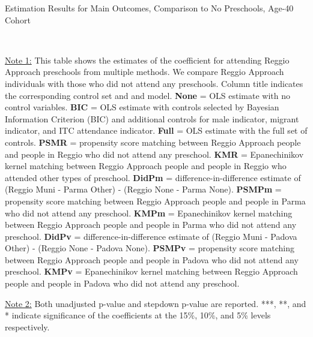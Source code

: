 \begin{table}[H] \caption{Estimation Results for Main Outcomes, Comparison to No Preschools, Age-40 Cohort} \label{ols-M-adult40-reg-nopres}
\scalebox{0.6}{}
\vspace{1ex} \\
\footnotesize\raggedright{\underline{Note 1:} This table shows the estimates of the coefficient for attending Reggio Approach preschools from multiple methods. We compare Reggio Approach individuals with those who did not attend any preschools. Column title indicates the corresponding control set and and model. \textbf{None} = OLS estimate with no control variables. \textbf{BIC} = OLS estimate with controls selected by Bayesian Information Criterion (BIC) and additional controls for male indicator, migrant indicator, and ITC attendance indicator. \textbf{Full} = OLS estimate with the full set of controls. \textbf{PSMR} =  propensity score matching between Reggio Approach people and people in Reggio who did not attend any preschool. \textbf{KMR} = Epanechinikov kernel matching between Reggio Approach people and people in Reggio who attended other types of preschool. \textbf{DidPm} = difference-in-difference estimate of (Reggio Muni - Parma Other) - (Reggio None - Parma None). \textbf{PSMPm} = propensity score matching between Reggio Approach people and people in Parma who did not attend any preschool. \textbf{KMPm} = Epanechinikov kernel matching between Reggio Approach people and people in Parma who did not attend any preschool. \textbf{DidPv} = difference-in-difference estimate of (Reggio Muni - Padova Other) - (Reggio None - Padova None). \textbf{PSMPv} = propensity score matching between Reggio Approach people and people in Padova who did not attend any preschool. \textbf{KMPv} = Epanechinikov kernel matching between Reggio Approach people and people in Padova who did not attend any preschool.}

\footnotesize\raggedright{\underline{Note 2:} Both unadjusted p-value and stepdown p-value are reported. ***, **, and * indicate significance of the coefficients at the 15\%, 10\%, and 5\% levels respectively.}
\end{table}


